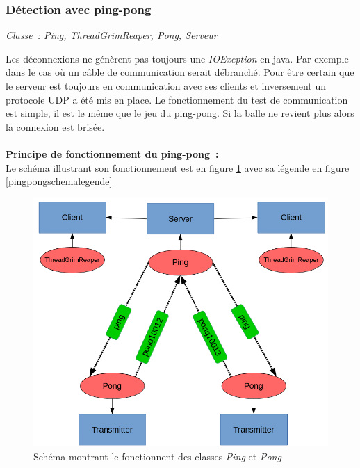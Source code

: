 \documentclass[a4paper,11pt]{report}
\begin{document}
    \subsubsection{Détection avec ping-pong}
    \begin{center}
    \textit{Classe : Ping, ThreadGrimReaper, Pong, Serveur}
    \end{center}
      Les déconnexions ne génèrent pas toujours une \textit{IOExeption} en java. Par exemple dans le cas où un câble de communication serait débranché. Pour être certain que le serveur est toujours en communication avec ses clients et inversement un protocole UDP a été mis en place. Le fonctionnement du test de communication est simple, il est le même que le jeu du ping-pong. Si la balle ne revient plus alors la connexion est brisée.
\\
\\
\textbf{Principe de fonctionnement du ping-pong :}
\\
Le schéma illustrant son fonctionnement est en figure \ref{pingpongschema} avec sa légende en figure \ref{pingpongschemalegende}
\begin{figure}[th]
      \begin{center}
        \includegraphics[scale=0.5]{Assets/s_r_3.png}
        \caption{Schéma montrant le fonctionnent des classes \textit{Ping} et \textit{Pong}}
        \label{pingpongschema}
      \end{center}
\end{figure}
\end{document}
